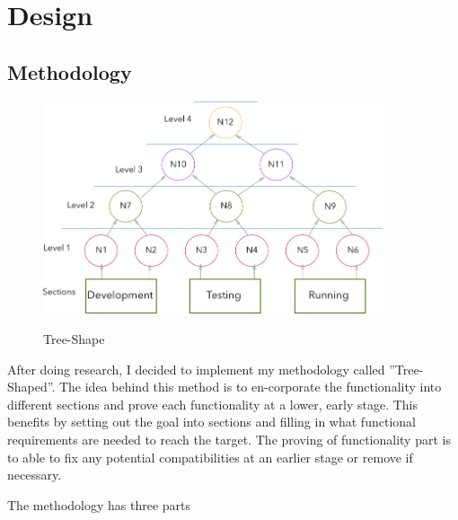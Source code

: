 \chapter{Design}

\section{Methodology}

\begin{figure}[!h]
    \caption{Tree-Shape}
    \centering
    \includegraphics[width=100mm]{images/methodology}
    \label{fig:label}
\end{figure}



After doing research, I decided to implement my methodology called ”Tree-Shaped”. The idea behind this method is to en-corporate the functionality into different sections and prove each functionality at a lower, early stage. This benefits by setting out the goal into sections and filling in what functional requirements are needed to reach the target. The proving of functionality part is to able to fix any potential compatibilities at an earlier stage or remove if necessary.

The methodology has three parts

